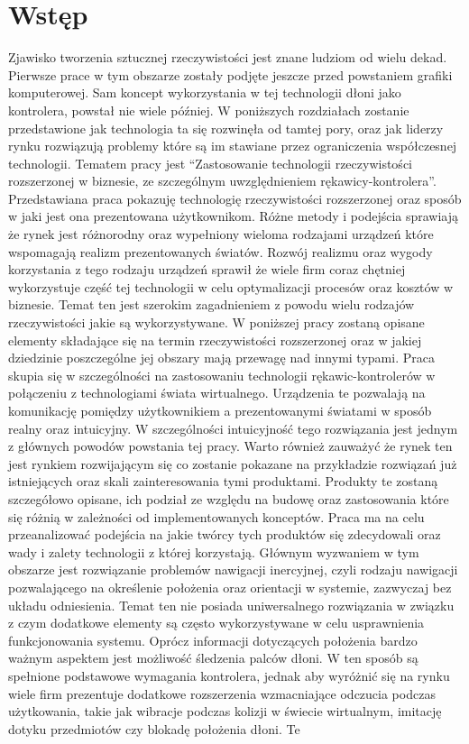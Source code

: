 \chapter*{Wstęp}
\label{ch:wstep}
Zjawisko tworzenia sztucznej rzeczywistości jest znane ludziom od wielu dekad. Pierwsze prace w tym obszarze zostały podjęte jeszcze przed powstaniem grafiki komputerowej. Sam koncept wykorzystania w tej technologii dłoni jako kontrolera, powstał nie wiele później. W poniższych rozdziałach zostanie przedstawione jak technologia ta się  rozwinęła od tamtej pory, oraz jak liderzy rynku rozwiązują problemy które są im stawiane przez ograniczenia współczesnej technologii. Tematem pracy jest ``Zastosowanie technologii rzeczywistości rozszerzonej w biznesie, ze szczególnym uwzględnieniem rękawicy-kontrolera''. Przedstawiana praca pokazuję technologię rzeczywistości rozszerzonej oraz sposób w jaki jest ona prezentowana użytkownikom. Różne metody i podejścia sprawiają że rynek jest różnorodny oraz wypełniony wieloma rodzajami urządzeń które wspomagają realizm prezentowanych światów. Rozwój realizmu oraz wygody korzystania z tego rodzaju urządzeń sprawił że wiele firm coraz chętniej wykorzystuje część tej technologii w celu optymalizacji procesów oraz kosztów w biznesie. Temat ten jest szerokim zagadnieniem z powodu wielu rodzajów rzeczywistości jakie są wykorzystywane. W poniższej pracy zostaną opisane elementy składające się na termin rzeczywistości rozszerzonej oraz w jakiej dziedzinie poszczególne jej obszary mają przewagę nad innymi typami. Praca skupia się w szczególności na zastosowaniu technologii rękawic-kontrolerów w połączeniu z technologiami świata wirtualnego. Urządzenia te pozwalają na komunikację pomiędzy użytkownikiem a prezentowanymi światami w sposób realny oraz intuicyjny. W szczególności intuicyjność tego rozwiązania jest jednym z głównych powodów powstania tej pracy. Warto również zauważyć że rynek ten jest rynkiem rozwijającym się co zostanie pokazane na przykładzie rozwiązań już istniejących oraz skali zainteresowania tymi produktami. Produkty te zostaną szczegółowo opisane, ich podział ze względu na budowę oraz zastosowania które się różnią w zależności od implementowanych konceptów. Praca ma na celu przeanalizować podejścia na jakie twórcy tych produktów się zdecydowali oraz wady i zalety technologii z której korzystają. Głównym wyzwaniem w tym obszarze jest rozwiązanie problemów nawigacji inercyjnej, czyli rodzaju nawigacji pozwalającego na określenie położenia oraz orientacji w systemie, zazwyczaj bez układu odniesienia. Temat ten nie posiada uniwersalnego rozwiązania w związku z czym dodatkowe elementy są często wykorzystywane w celu usprawnienia funkcjonowania systemu. Oprócz informacji dotyczących położenia bardzo ważnym aspektem jest możliwość śledzenia palców dłoni. W ten sposób są spełnione podstawowe wymagania kontrolera, jednak aby wyróżnić się na rynku wiele firm prezentuje dodatkowe rozszerzenia wzmacniające odczucia podczas użytkowania, takie jak wibracje podczas kolizji w świecie wirtualnym, imitację dotyku przedmiotów czy blokadę położenia dłoni. Te 
